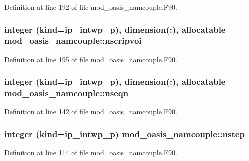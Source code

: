 Definition at line 192 of file mod\+\_\+oasis\+\_\+namcouple.\+F90.

\hypertarget{classmod__oasis__namcouple_abb6f67bfba2cba424dabee3a465fdfd5}{
\subsubsection[{nscripvoi}]{\setlength{\rightskip}{0pt plus 5cm}integer (kind=ip\+\_\+intwp\+\_\+p), dimension(\+:), allocatable mod\+\_\+oasis\+\_\+namcouple\+::nscripvoi\hspace{0.3cm}{\ttfamily [private]}}}\label{classmod__oasis__namcouple_abb6f67bfba2cba424dabee3a465fdfd5}


Definition at line 195 of file mod\+\_\+oasis\+\_\+namcouple.\+F90.

\hypertarget{classmod__oasis__namcouple_a20e9486f3e8bbdcee0de935e9be3a2e8}{
\subsubsection[{nseqn}]{\setlength{\rightskip}{0pt plus 5cm}integer (kind=ip\+\_\+intwp\+\_\+p), dimension(\+:), allocatable mod\+\_\+oasis\+\_\+namcouple\+::nseqn\hspace{0.3cm}{\ttfamily [private]}}}\label{classmod__oasis__namcouple_a20e9486f3e8bbdcee0de935e9be3a2e8}


Definition at line 142 of file mod\+\_\+oasis\+\_\+namcouple.\+F90.

\hypertarget{classmod__oasis__namcouple_a66c36f23a77081749dc9e7993b0277f3}{
\subsubsection[{nstep}]{\setlength{\rightskip}{0pt plus 5cm}integer (kind=ip\+\_\+intwp\+\_\+p) mod\+\_\+oasis\+\_\+namcouple\+::nstep\hspace{0.3cm}{\ttfamily [private]}}}\label{classmod__oasis__namcouple_a66c36f23a77081749dc9e7993b0277f3}


Definition at line 114 of file mod\+\_\+oasis\+\_\+namcouple.\+F90.

